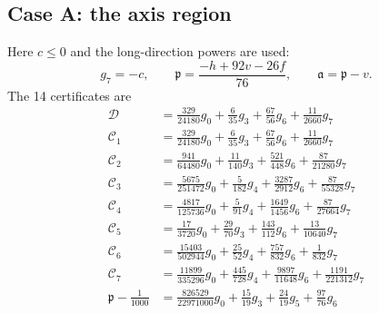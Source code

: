\documentclass[11pt,a4paper]{article}
\numberwithin{equation}{section}
\theoremstyle{remark}
\begin{document}
\subsection{Case A: the axis region}
Here $c\le0$ and the long-direction powers are used:
\[
 g_7=-c,\qquad
 \mathfrak p=\frac{-h+92v-26f}{76},\qquad
 \mathfrak a=\mathfrak p-v.
\]
The 14 certificates are
\begingroup
\small
\begin{align}
\mathcal D &= \frac{329}{24180}g_{0}+\frac{6}{35}g_{3}+\frac{67}{56}g_{6}+\frac{11}{2660}g_{7}\label{cert:axis:1}\\
\mathcal C_1 &= \frac{329}{24180}g_{0}+\frac{6}{35}g_{3}+\frac{67}{56}g_{6}+\frac{11}{2660}g_{7}\label{cert:axis:2}\\
\mathcal C_2 &= \frac{941}{64480}g_{0}+\frac{11}{140}g_{3}+\frac{521}{448}g_{6}+\frac{87}{21280}g_{7}\label{cert:axis:3}\\
\mathcal C_3 &= \frac{5675}{251472}g_{0}+\frac{5}{182}g_{4}+\frac{3287}{2912}g_{6}+\frac{87}{55328}g_{7}\label{cert:axis:4}\\
\mathcal C_4 &= \frac{4817}{125736}g_{0}+\frac{5}{91}g_{4}+\frac{1649}{1456}g_{6}+\frac{87}{27664}g_{7}\label{cert:axis:5}\\
\mathcal C_5 &= \frac{17}{3720}g_{0}+\frac{29}{70}g_{3}+\frac{143}{112}g_{6}+\frac{13}{10640}g_{7}\label{cert:axis:6}\\
\mathcal C_6 &= \frac{15403}{502944}g_{0}+\frac{25}{52}g_{4}+\frac{757}{832}g_{6}+\frac{1}{832}g_{7}\label{cert:axis:7}\\
\mathcal C_7 &= \frac{11899}{335296}g_{0}+\frac{445}{728}g_{4}+\frac{9897}{11648}g_{6}+\frac{1191}{221312}g_{7}\label{cert:axis:8}\\
\mathfrak p-\frac1{1000} &= \frac{826529}{22971000}g_{0}+\frac{15}{19}g_{3}+\frac{24}{19}g_{5}+\frac{97}{76}g_{6}\label{cert:axis:9}\\

\end{align}
\end{document}

